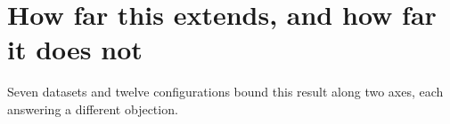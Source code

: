 
\section{How far this extends, and how far it does not}
\label{apx:cosine:extension}

Seven datasets and twelve configurations bound this result along two axes, each answering a different
objection.

